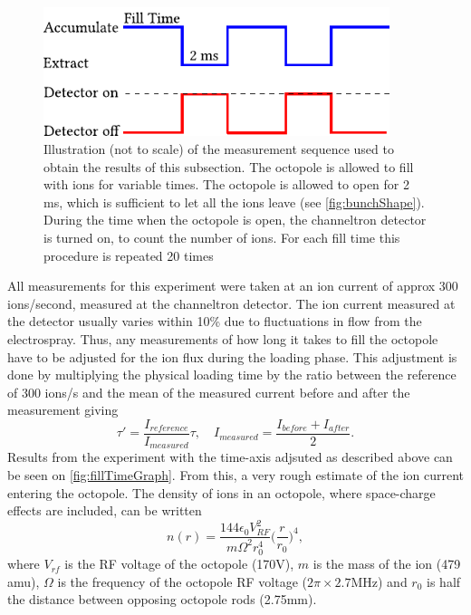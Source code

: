 \begin{figure}
    \centering
    \includegraphics[width = 0.9\textwidth]{main/StoragePulse.pdf}
    \caption{Illustration (not to scale) of the measurement sequence used to obtain the results of this subsection. The octopole is allowed to fill with ions for variable times. The octopole is allowed to open for 2 ms, which is sufficient to let all the ions leave (see \cref{fig:bunchShape}). During the time when the octopole is open,
    the channeltron detector is turned on, to count the number of ions. For each fill time this procedure is repeated 20 times}
    \label{fig:storageSequence}
\end{figure}
All measurements for this experiment were taken at an ion current of approx 300 ions/second, measured at the channeltron detector.
The ion current measured at the detector usually varies within 10\% due to fluctuations in flow from the electrospray. Thus, any measurements of how long it takes to fill the octopole have to be adjusted for the ion flux during the loading phase.  This adjustment is done by multiplying the physical loading time by the ratio between the reference of 300 ions/s and the mean of the measured current before and after the measurement giving
\begin{equation}
    \tau'= \frac{I_{reference}}{I_{measured}}\tau,\quad I_{measured} = \frac{I_{before}+I_{after}}{2}.
\end{equation}
Results from the experiment with the time-axis adjsuted as described above can be seen on \cref{fig:fillTimeGraph}. From this, a very rough estimate of the ion current entering the octopole.
The density of ions in an octopole, where space-charge effects are included, can be written \cite{MajimaDensity}
\begin{equation}
    n(r) = \frac{144\epsilon_0 V_{RF}^2}{m\Omega^2r_0^4}\bigg(\frac{r}{r_0}\bigg)^4,
\end{equation}
where $V_{rf}$ is the RF voltage of the octopole (170V), $m$ is the mass of the ion (479 amu), $\Omega$ is the frequency of the octopole RF voltage ($2\pi\times2.7$MHz) and $r_0$ is half the distance between opposing octopole rods (2.75mm).


